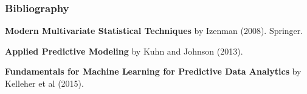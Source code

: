 \documentclass[12pt]{beamer}\usepackage[]{graphicx}\usepackage[]{color}
\begin{document}

\begin{frame}
\frametitle{Bibliography}

{\footnotesize
\bi
  \item \textbf{Modern Multivariate Statistical Techniques} by Izenman (2008). Springer.
  \item \textbf{Applied Predictive Modeling} by Kuhn and Johnson (2013).
  \item \textbf{Fundamentals for Machine Learning for Predictive Data Analytics} by Kelleher et al (2015).
\ei
}

\end{frame}

\end{document}
